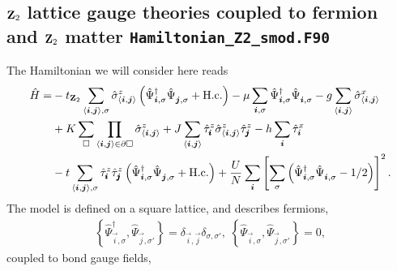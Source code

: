 

\subsection{$\mathbf{Z}_{2}$ lattice gauge theories coupled to fermion and $\mathbf{Z}_{2}$ matter  \texttt{Hamiltonian\_Z2\_smod.F90}} \label{Z2.Sec}

The Hamiltonian we will consider here reads
\begin{align}
	\hat{H} =& -  t_{\Ztwo} \sum_{\langle \vec{i}, \vec{j} \rangle, \sigma } \hat{\sigma}^z_{\langle \vec{i}, \vec{j} \rangle}
	\left(\hat{\Psi}^{\dagger}_{\vec{i},\sigma} \hat{\Psi}^{\phantom{\dagger}}_{\vec{j},\sigma}   + \hc \right) - \mu \sum_{\vec{i},\sigma} \hat{\Psi}^{\dagger}_{\vec{i},\sigma} \hat{\Psi}^{\phantom{\dagger}}_{\vec{i},\sigma}  
	-g \sum_{\langle \vec{i}, \vec{j} \rangle } \hat{\sigma}^{x}_{\langle \vec{i}, \vec{j} \rangle } \nonumber \\
	  & +K \sum_{\square} \prod_{\langle \vec{i}, \vec{j} \rangle \in \partial \square} \hat{\sigma}^{z}_{\langle \vec{i}, \vec{j} \rangle}  
	 + J  \sum_{\langle \vec{i}, \vec{j} \rangle}  \hat{\tau}^z_{\pmb{i}}  \hat{\sigma}^{z}_{\langle \vec{i}, \vec{j} \rangle} \hat{\tau}^z_{\pmb{j}}   
	      -  h \sum_{ \vec{i} } \hat{\tau}^x_{\vec{i}} \nonumber \\
	& - t  \sum_{\langle \vec{i}, \vec{j} \rangle, \sigma }   \hat{\tau}^z_{\pmb{i}}   \hat{\tau}^z_{\pmb{j}}  \left( \hat{\Psi}^{\dagger}_{\vec{i},\sigma} \hat{\Psi}^{\phantom{\dagger}}_{\vec{j},\sigma} 	+ \hc \right) + \frac{U}{N}\sum_{\ve{i}} \left[ \sum_{\sigma}  \left( \hat{\Psi}^{\dagger}_{\ve{i},\sigma}  \hat{\Psi}^{\phantom\dagger}_{\ve{i},\sigma} - 1/2\right) \right]^2.
\end{align}  
The model is defined on a square lattice, and describes  fermions, 
\begin{align}
 \left\{ \hat{\Psi}^{\dagger}_{\vec{i},\sigma},  \hat{\Psi}^{\phantom\dagger}_{\vec{j},\sigma'} \right\}  = \delta_{\vec{i},\vec{j}} \delta_{\sigma,\sigma'}, \;  
\left\{ \hat{\Psi}^{\phantom\dagger}_{\vec{i},\sigma},  \hat{\Psi}^{\phantom\dagger}_{\vec{j},\sigma'} \right\}  =  0,  
\end{align}
coupled to  bond gauge fields, 
